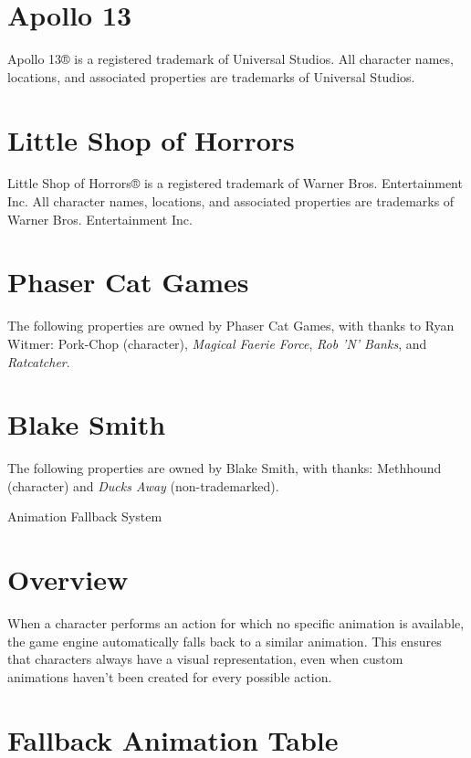 \documentclass[11pt,letterpaper,oldstylefigures]{memoir}
\makeatletter
\let\oldchapter\chapter
\def\chapter{%
  \@ifstar
    {\FountainScripting@starchapter}%
    {\@dblarg\FountainScripting@chapter}}
\def\FountainScripting@starchapter#1{\oldchapter*{#1}\chaptermark{#1}}
\def\FountainScripting@chapter[#1]#2{\oldchapter[#1]{#2}\chaptermark{#2}}
\makeatother
\begin{document}
\section{Apollo 13}
Apollo 13® is a registered trademark of Universal Studios. All character names, locations, and associated properties are trademarks of Universal Studios.

\section{Little Shop of Horrors}
Little Shop of Horrors® is a registered trademark of Warner Bros. Entertainment Inc. All character names, locations, and associated properties are trademarks of Warner Bros. Entertainment Inc.

\section{Phaser Cat Games}
The following properties are owned by Phaser Cat Games, with thanks to Ryan Witmer: Pork-Chop (character), \textit{Magical Faerie Force}, \textit{Rob 'N' Banks}, and \textit{Ratcatcher}.

\section{Blake Smith}
The following properties are owned by Blake Smith, with thanks: Methhound (character) and \textit{Ducks Away} (non-trademarked).

\appendix

\chapter{Animation Fallback System}

\section{Overview}

When a character performs an action for which no specific animation is available, the game engine automatically falls back to a similar animation. This ensures that characters always have a visual representation, even when custom animations haven't been created for every possible action.

\section{Fallback Animation Table}
\end{document}

